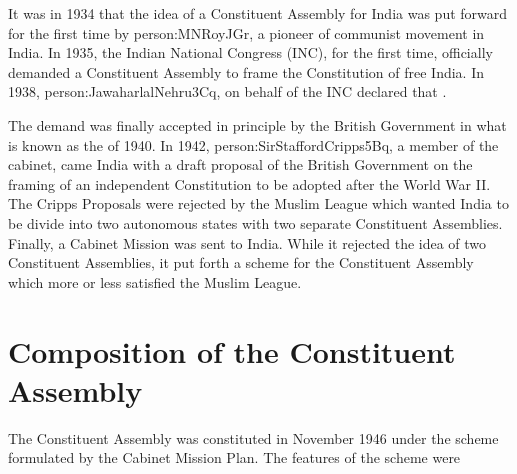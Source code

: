 It was in 1934 that the idea of a Constituent Assembly for India was put forward for the first time by \gls{person:MNRoyJGr}, a pioneer of communist movement in India. In 1935, the Indian National Congress (INC), for the first time, officially demanded a Constituent Assembly to frame the Constitution of free India. In 1938, \gls{person:JawaharlalNehru3Cq}, on behalf of the INC declared that .

The demand was finally accepted in principle by the British Government in what is known as the  of 1940. In 1942, \gls{person:SirStaffordCripps5Bq}, a member of the cabinet, came India with a draft proposal of the British Government on the framing of an independent Constitution to be adopted after the World War II. The Cripps Proposals were rejected by the Muslim League which wanted India to be divide into two autonomous states with two separate Constituent Assemblies. Finally, a Cabinet Mission was sent to India. While it rejected the idea of two Constituent Assemblies, it put forth a scheme for the Constituent Assembly which more or less satisfied the Muslim League.

\section{Composition of the Constituent Assembly}

The Constituent Assembly was constituted in November 1946 under the scheme formulated by the Cabinet Mission Plan. The features of the scheme were

